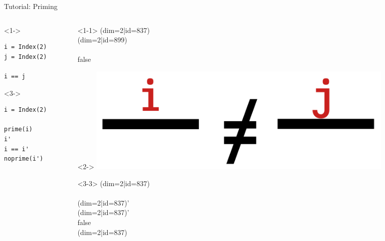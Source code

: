 \begin{frame}[fragile]{Tutorial: Priming}

\begin{columns}

\begin{column}{4.5cm}

\begin{onlyenv}<1->
\begin{lstlisting}[language=JuliaLocal, style=julia, basicstyle=\small]
i = Index(2)
j = Index(2)

i == j
\end{lstlisting}
\end{onlyenv}

\begin{onlyenv}<3->
\begin{lstlisting}[language=JuliaLocal, style=julia, basicstyle=\small]
i = Index(2)

prime(i)
i'
i == i'
noprime(i')
\end{lstlisting}
\end{onlyenv}

\end{column}

\begin{column}{4.5cm}

\begin{onlyenv}<1-1>
(dim=2|id=837) \\
(dim=2|id=899) \\
~\\
false \\
\end{onlyenv}

\begin{onlyenv}<2->
\includegraphics[width=0.8\textwidth]{
  slides/assets/i_neq_j.png
}
\vspace*{1.0cm}
\end{onlyenv}

\begin{onlyenv}<3-3>
(dim=2|id=837) \\
~\\
(dim=2|id=837)' \\
(dim=2|id=837)' \\
false \\
(dim=2|id=837)
\end{onlyenv}


\end{column}
\end{columns}
\end{frame}

